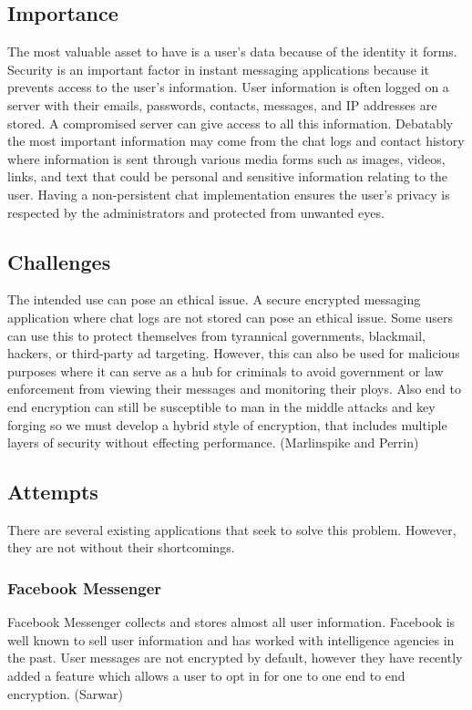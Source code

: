 \documentclass[11pt]{article}
\theoremstyle{plain}
\theoremstyle{definition}
\begin{document}
\subsection{Importance}\label{sec:importance}
The most valuable asset to have is a user’s data because of the identity it forms. Security is an important factor in instant messaging applications because it prevents access to the user’s information. User information is often logged on a server with their emails, passwords, contacts, messages, and IP addresses are stored. A compromised server can give access to all this information. Debatably the most important information may come from the chat logs and contact history where information is sent through various media forms such as images, videos, links, and text that could be personal and sensitive information relating to the user. Having a non-persistent chat implementation ensures the user’s privacy is respected by the administrators and protected from unwanted eyes.

\subsection{Challenges}\label{sec:challenges}
The intended use can pose an ethical issue. A secure encrypted messaging application where chat logs are not stored can pose an ethical issue. Some users can use this to protect themselves from tyrannical governments, blackmail, hackers, or third-party ad targeting. However, this can also be used for malicious purposes where it can serve as a hub for criminals to avoid government or law enforcement from viewing their messages and monitoring their ploys. Also end to end encryption can still be susceptible to man in the middle attacks and key forging so we must develop a hybrid style of encryption, that includes multiple layers of security without effecting performance. (Marlinspike and Perrin)

\subsection{Attempts}\label{sec:attempts}
There are several existing applications that seek to solve this problem. However, they are not without their shortcomings.
\subsubsection{Facebook Messenger}
Facebook Messenger collects and stores almost all user information. Facebook is well known to sell user information and has worked with intelligence agencies in the past. User messages are not encrypted by default, however they have recently added a feature which allows a user to opt in for one to one end to end encryption. (Sarwar)
\end{document}
